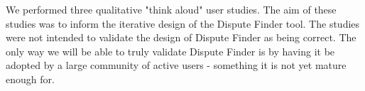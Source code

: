 \documentclass{www2010-submission}
\newcommand{\todo}[1]{}
\begin{document}
%
%
%
%
%
%
%

We performed three qualitative "think aloud" user studies. The aim of these studies was to inform the iterative design of the Dispute Finder tool. The studies were not intended to validate the design of Dispute Finder as being correct. The only way we will be able to truly validate Dispute Finder is by having it be adopted by a large community of active users - something it is not yet mature enough for.
\end{document}
